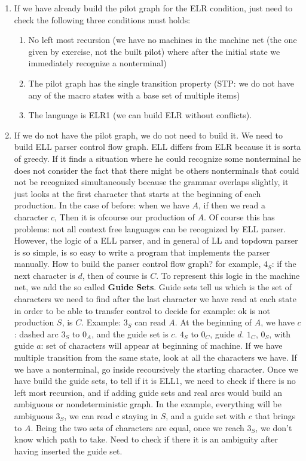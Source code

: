 			\begin{enumerate}
				\item If we have already build the pilot graph for the ELR condition, just need to check the following three conditions must holds:
				\begin{enumerate}
					\item No left most recursion (we have no machines in the machine net (the one given by exercise, not the built pilot) where after the initial state we immediately recognize a nonterminal)
					\item The pilot graph has the single transition property (STP: we do not have any of the macro states with a base set of multiple items)
					\item The language is ELR1 (we can build ELR without conflicts).
				\end{enumerate}
				\item If we do not have the pilot graph, we do not need to build it. We need to build ELL parser control flow graph. ELL differs from ELR because it is sorta of greedy.
				If it finds a situation where he could recognize some nonterminal he does not consider the fact that there might be others nonterminals that could not be recognized simultaneously 
				because the grammar overlaps slightly, it just looks at the first character that starts at the beginning of each production. In the case of before: when we have $A$, if then we read a character $c$,
				Then it is ofcourse our production of $A$. Of course this has problems: not all context free languages can be recognized by ELL parser. However, the logic of a ELL parser, and in general of 
				LL and topdown parser is so simple, is so easy to write a program that implements the parser manually. How to build the parser control flow graph? for example, $4_S$: if the next 
				character is $d$, then of course is $C$. To represent this logic in the machine net, we add the so called \textbf{Guide Sets}. Guide sets tell us which is the set of characters 
				we need to find after the last character we have read at each state in order to be able to transfer control to decide for example: ok is not production $S$, is $C$. Example: $3_S$ can read $A$.
				At the beginning of $A$, we have $c$: dashed arc $3_S$ to $0_A$, and the guide set is $c$. $4_S$ to $0_C$, guide $d$. $1_C$, $0_S$, with guide $a$: set of characters will appear at 
				beginning of machine. If we have multiple transition from the same state, look at all the characters we have. If we have a nonterminal, go inside recoursively the starting character.
				Once we have build the guide sets, to tell if it is ELL1, we need to check if there is no left most recursion, and if adding guide sets and real arcs would build an ambiguous or nondeterministic 
				graph. In the example, everything will be ambiguous $3_S$, we can read $c$ staying in $S$, and a guide set with $c$ that brings to $A$. Being the two sets of characters are equal, once we reach $3_S$, 
				we don't know which path to take. Need to check if there it is an ambiguity after having inserted the guide set.
			\end{enumerate}
